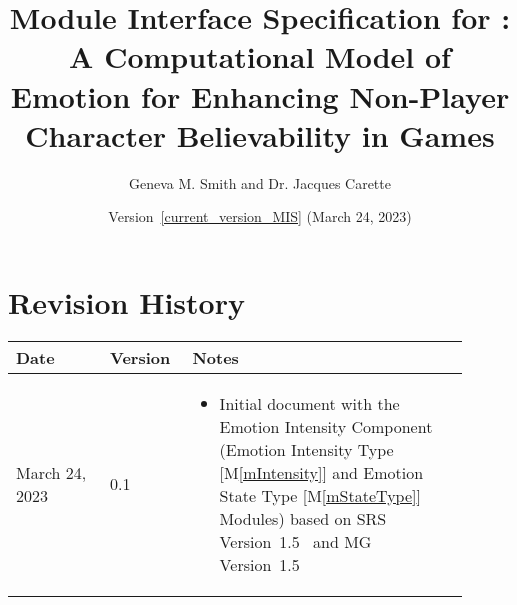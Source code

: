 \documentclass[11pt, titlepage]{article}
\makeatletter
\newcommand\newref[1]{#1\def\@currentlabel{#1}}
\newcommand{\mref}[1]{M\ref{#1}}
\makeatother
\begin{document}
    \setcounter{pagesMIS}{\totalpages}

    \begin{titlepage}
        \thispagestyle{empty}
        \title{Module Interface Specification for \progname{}: A Computational
        Model of Emotion for Enhancing Non-Player Character Believability in
        Games}
        \author{Geneva M. Smith and Dr. Jacques Carette}
        \date{Version~\ref{current_version_MIS} (March 24, 2023)}

        \maketitle
    \end{titlepage}

    \pagestyle{fancy}

    \vspace*{\fill}
    \section*{Revision History}
    \begin{center}
        \begin{tabular}{m{0.19\linewidth}C{0.15\linewidth}m{0.56\linewidth}}
            \toprule
            {\bf Date} & {\bf Version} & {\bf Notes}\\
            \midrule
            \vspace*{1mm}March 24, 2023 &
            \vspace*{1mm}\newref{0.1}\label{current_version_MIS} & \vspace*{6mm}
            \begin{itemize}[noitemsep, nosep, leftmargin=*]
                \item Initial document with the Emotion Intensity Component
                (Emotion Intensity Type [\mref{mIntensity}] and Emotion State
                Type [\mref{mStateType}] Modules) based on SRS Version~1.5~ and
                MG Version~1.5
            \end{itemize} \\
            \bottomrule
        \end{tabular}
    \end{center}
    \vspace*{\fill}

    \clearpage

    \tableofcontents

    \clearpage
\end{document}
